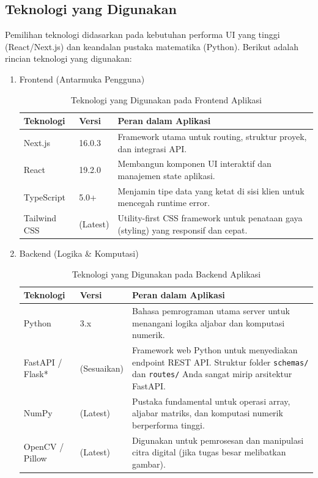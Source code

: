 \documentclass[12pt,a4paper]{article}
\begin{document}
\subsection{Teknologi yang Digunakan}
Pemilihan teknologi didasarkan pada kebutuhan performa UI yang tinggi (React/Next.js) dan keandalan pustaka matematika (Python). Berikut adalah rincian teknologi yang digunakan:
\begin{enumerate}[label=\Alph*.]
    \item Frontend (Antarmuka Pengguna)
    \begin{table}[H]
    \centering
    \begin{tabularx}{\linewidth}{l l X}
        \toprule
        \textbf{Teknologi} & \textbf{Versi} & \textbf{Peran dalam Aplikasi} \\
        \midrule
        Next.js     & 16.0.3   & Framework utama untuk routing, struktur proyek, dan integrasi API. \\
        React       & 19.2.0   & Membangun komponen UI interaktif dan manajemen state aplikasi. \\
        TypeScript  & 5.0+     & Menjamin tipe data yang ketat di sisi klien untuk mencegah runtime error. \\
        Tailwind CSS & (Latest) & Utility-first CSS framework untuk penataan gaya (styling) yang responsif dan cepat. \\
        \bottomrule
    \end{tabularx}
    \caption{Teknologi yang Digunakan pada Frontend Aplikasi}
    \label{tab:teknologi-frontend}
    \end{table}

    \item Backend (Logika \& Komputasi)
    \begin{table}[H]
    \centering
    \begin{tabularx}{\linewidth}{l l X}
        \toprule
        \textbf{Teknologi} & \textbf{Versi} & \textbf{Peran dalam Aplikasi} \\
        \midrule
        Python          & 3.x      & Bahasa pemrograman utama server untuk menangani logika aljabar dan komputasi numerik. \\
        FastAPI / Flask* & (Sesuaikan) & Framework web Python untuk menyediakan endpoint REST API. Struktur folder \texttt{schemas/} dan \texttt{routes/} Anda sangat mirip arsitektur FastAPI. \\
        NumPy           & (Latest) & Pustaka fundamental untuk operasi array, aljabar matriks, dan komputasi numerik berperforma tinggi. \\
        OpenCV / Pillow & (Latest) & Digunakan untuk pemrosesan dan manipulasi citra digital (jika tugas besar melibatkan gambar). \\
        \bottomrule
    \end{tabularx}
    \caption{Teknologi yang Digunakan pada Backend Aplikasi}
    \label{tab:teknologi-backend}
    \end{table}
\end{enumerate}
\end{document}
